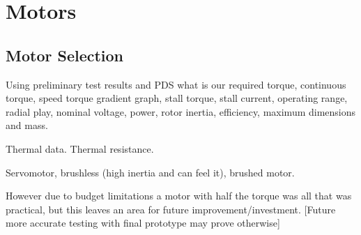 
\section{Motors}\label{sec:motors}

\subsection{Motor Selection}\label{sub:motor-selection}




Using preliminary test results and PDS what is our required torque,
continuous torque, speed torque gradient graph, stall torque, stall
current, operating range, radial play, nominal voltage, power, rotor
inertia, efficiency, maximum dimensions and mass.

Thermal data. Thermal resistance.

Servomotor, brushless (high inertia and can feel it), brushed motor.

However due to budget limitations a motor with half the torque was all
that was practical, but this leaves an area for future
improvement/investment. {[}Future more accurate testing with final
prototype may prove otherwise{]}

